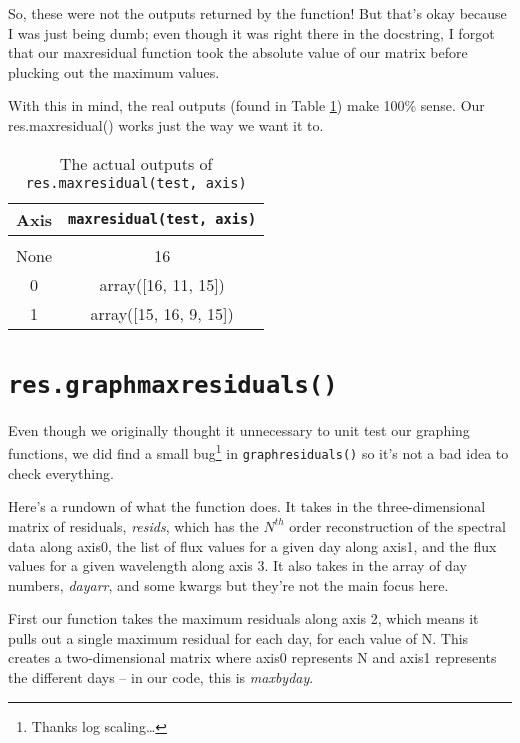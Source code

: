 \documentclass{article}
\begin{document}
So, these were not the outputs returned by the function!  But that's
okay because I was just being dumb; even though it was right there in
the docstring, I forgot that our maxresidual function took the
absolute value of our matrix before plucking out the maximum values.

With this in mind, the real outputs (found in Table \ref{tab:axes2}) make 100\% sense.  Our res.maxresidual()
works just the way we want it to.

\begin{table}
  \centering
  \begin{tabular}[c]{|c|c|}
    \hline\hline
    Axis & \verb|maxresidual(test, axis)| \\
    \hline \\ [-1.5ex]
    None & 16 \\ [1ex]
    0 & array([16, 11, 15]) \\ [1ex]
    1 & array([15, 16, 9, 15]) \\ [1ex]
    \hline
  \end{tabular}
  \caption{The actual outputs of \texttt{res.maxresidual(test,
      axis)}}
\label{tab:axes2}
\end{table}


\section{\texttt{res.graphmaxresiduals()}}
\label{sec:graphmaxresiduals}

Even though we originally thought it unnecessary to unit test our
graphing functions, we did find a small bug\footnote{Thanks log
  scaling\ldots} in \verb|graphresiduals()| so it's not a bad idea to
check everything.

Here's a rundown of what the function does.  It takes in the
three-dimensional matrix of residuals, \textit{resids}, which has the
$N^{th}$ order reconstruction of the spectral data along axis0, the list of
flux values for a given day along axis1, and the flux values for a
given wavelength along axis 3.  It also takes in the array of day
numbers, \textit{dayarr}, and some kwargs but they're not the main
focus here.

First our function takes the maximum residuals along axis 2, which
means it pulls out a single maximum residual for each day, for each
value of N. This creates a two-dimensional matrix where axis0
represents N and axis1 represents the different days -- in our code,
this is \textit{maxbyday}.
\end{document}
